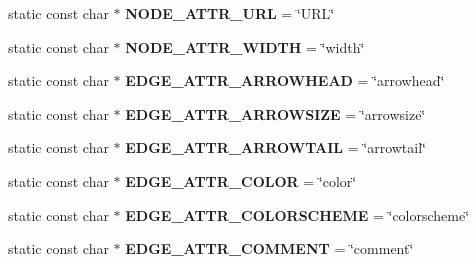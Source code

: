 \begin{DoxyCompactItemize}
\item 
static const char $\ast$ {\bfseries N\+O\+D\+E\+\_\+\+A\+T\+T\+R\+\_\+\+U\+RL} = \char`\"{}U\+RL\char`\"{}\hypertarget{classmemgraph_1_1_graphviz_attrs_ac6a28ccc3bef6f771514852e3cc45a55}{}\label{classmemgraph_1_1_graphviz_attrs_ac6a28ccc3bef6f771514852e3cc45a55}

\item 
static const char $\ast$ {\bfseries N\+O\+D\+E\+\_\+\+A\+T\+T\+R\+\_\+\+W\+I\+D\+TH} = \char`\"{}width\char`\"{}\hypertarget{classmemgraph_1_1_graphviz_attrs_a5a7e8ec87fbcb73c14c1876195d944f2}{}\label{classmemgraph_1_1_graphviz_attrs_a5a7e8ec87fbcb73c14c1876195d944f2}

\item 
static const char $\ast$ {\bfseries E\+D\+G\+E\+\_\+\+A\+T\+T\+R\+\_\+\+A\+R\+R\+O\+W\+H\+E\+AD} = \char`\"{}arrowhead\char`\"{}\hypertarget{classmemgraph_1_1_graphviz_attrs_a6907b50fffe6e3f93cb4233c8a51d19d}{}\label{classmemgraph_1_1_graphviz_attrs_a6907b50fffe6e3f93cb4233c8a51d19d}

\item 
static const char $\ast$ {\bfseries E\+D\+G\+E\+\_\+\+A\+T\+T\+R\+\_\+\+A\+R\+R\+O\+W\+S\+I\+ZE} = \char`\"{}arrowsize\char`\"{}\hypertarget{classmemgraph_1_1_graphviz_attrs_a66e3d49ce579e69a945d219781728850}{}\label{classmemgraph_1_1_graphviz_attrs_a66e3d49ce579e69a945d219781728850}

\item 
static const char $\ast$ {\bfseries E\+D\+G\+E\+\_\+\+A\+T\+T\+R\+\_\+\+A\+R\+R\+O\+W\+T\+A\+IL} = \char`\"{}arrowtail\char`\"{}\hypertarget{classmemgraph_1_1_graphviz_attrs_a30cc52eae06aa0d6a2f305656a8b7840}{}\label{classmemgraph_1_1_graphviz_attrs_a30cc52eae06aa0d6a2f305656a8b7840}

\item 
static const char $\ast$ {\bfseries E\+D\+G\+E\+\_\+\+A\+T\+T\+R\+\_\+\+C\+O\+L\+OR} = \char`\"{}color\char`\"{}\hypertarget{classmemgraph_1_1_graphviz_attrs_aabef65c5135f3b05366a508775abc392}{}\label{classmemgraph_1_1_graphviz_attrs_aabef65c5135f3b05366a508775abc392}

\item 
static const char $\ast$ {\bfseries E\+D\+G\+E\+\_\+\+A\+T\+T\+R\+\_\+\+C\+O\+L\+O\+R\+S\+C\+H\+E\+ME} = \char`\"{}colorscheme\char`\"{}\hypertarget{classmemgraph_1_1_graphviz_attrs_a101012d505af788e08eae4ba0c270732}{}\label{classmemgraph_1_1_graphviz_attrs_a101012d505af788e08eae4ba0c270732}

\item 
static const char $\ast$ {\bfseries E\+D\+G\+E\+\_\+\+A\+T\+T\+R\+\_\+\+C\+O\+M\+M\+E\+NT} = \char`\"{}comment\char`\"{}\hypertarget{classmemgraph_1_1_graphviz_attrs_a41c43d8d4542676dc854f08dc3f87d17}{}\label{classmemgraph_1_1_graphviz_attrs_a41c43d8d4542676dc854f08dc3f87d17}


\end{DoxyCompactItemize}
